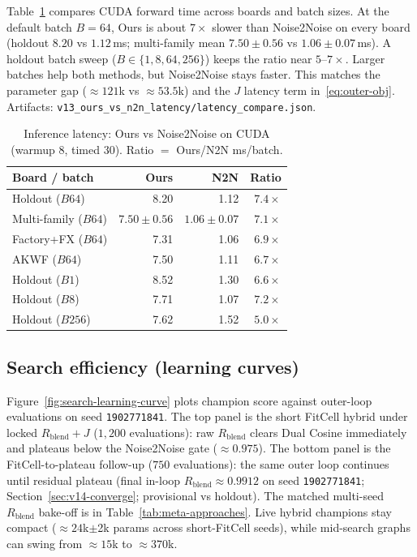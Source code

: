 Table~\ref{tab:ours-n2n-latency} compares CUDA forward time across boards and batch sizes.
At the default batch $B{=}64$, Ours is about $7\times$ slower than Noise2Noise on every board
(holdout $8.20$ vs $1.12$\,ms; multi-family mean $7.50{\pm}0.56$ vs $1.06{\pm}0.07$\,ms).
A holdout batch sweep ($B\in\{1,8,64,256\}$) keeps the ratio near $5$--$7\times$.
Larger batches help both methods, but Noise2Noise stays faster.
This matches the parameter gap (${\approx}121$k vs ${\approx}53.5$k) and the $J$ latency term in~\eqref{eq:outer-obj}.
Artifacts: \texttt{v13\_ours\_vs\_n2n\_latency/latency\_compare.json}.

\begin{table}[t]
  \centering
  \caption{Inference latency: Ours vs Noise2Noise on CUDA (warmup 8, timed 30).
    Ratio $=$ Ours/N2N ms/batch.}
  \label{tab:ours-n2n-latency}
  \setlength{\tabcolsep}{3pt}
  \scriptsize
  \begin{tabular}{@{}lrrr@{}}
    \toprule
    Board / batch & Ours & N2N & Ratio \\
    \midrule
    Holdout ($B64$) & 8.20 & 1.12 & $7.4\times$ \\
    Multi-family ($B64$) & $7.50{\pm}0.56$ & $1.06{\pm}0.07$ & $7.1\times$ \\
    Factory+FX ($B64$) & 7.31 & 1.06 & $6.9\times$ \\
    AKWF ($B64$) & 7.50 & 1.11 & $6.7\times$ \\
    Holdout ($B1$) & 8.52 & 1.30 & $6.6\times$ \\
    Holdout ($B8$) & 7.71 & 1.07 & $7.2\times$ \\
    Holdout ($B256$) & 7.62 & 1.52 & $5.0\times$ \\
    \bottomrule
  \end{tabular}
\end{table}

\subsection{Search efficiency (learning curves)}
\label{sec:search-learning-curve}

Figure~\ref{fig:search-learning-curve} plots champion score against outer-loop evaluations
on seed \texttt{1902771841}.
The top panel is the short FitCell hybrid under locked $R_{\mathrm{blend}}{+}J$ ($1{,}200$ evaluations):
raw $R_{\mathrm{blend}}$ clears Dual Cosine immediately and plateaus below the Noise2Noise gate (${\approx}0.975$).
The bottom panel is the FitCell-to-plateau follow-up ($750$ evaluations):
the same outer loop continues until residual plateau (final in-loop $R_{\mathrm{blend}}{\approx}0.9912$ on seed \texttt{1902771841}; Section~\ref{sec:v14-converge}; provisional vs holdout).
The matched multi-seed $R_{\mathrm{blend}}$ bake-off is in Table~\ref{tab:meta-approaches}.
Live hybrid champions stay compact (${\approx}24$k$\pm$2k params across short-FitCell seeds), while mid-search graphs can swing from ${\approx}15$k to ${\approx}370$k.

